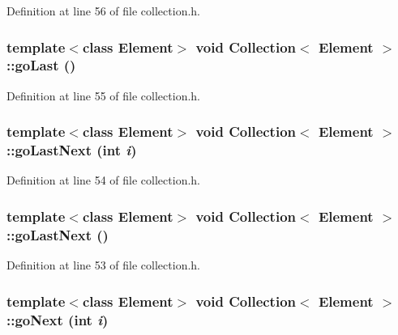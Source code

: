 Definition at line 56 of file collection.h.\hypertarget{classCollection_24f595ff9a3daddd71e9625e12086b8d}{
\subsubsection[{goLast}]{\setlength{\rightskip}{0pt plus 5cm}template$<$class Element$>$ void {\bf Collection}$<$ Element $>$::goLast ()}}
\label{classCollection_24f595ff9a3daddd71e9625e12086b8d}




Definition at line 55 of file collection.h.\hypertarget{classCollection_c8d2b742e6ccaf94d0e2511840a1783c}{
\subsubsection[{goLastNext}]{\setlength{\rightskip}{0pt plus 5cm}template$<$class Element$>$ void {\bf Collection}$<$ Element $>$::goLastNext (int {\em i})}}
\label{classCollection_c8d2b742e6ccaf94d0e2511840a1783c}




Definition at line 54 of file collection.h.\hypertarget{classCollection_ae18eb14625c9f4742d0c90e437f6035}{
\subsubsection[{goLastNext}]{\setlength{\rightskip}{0pt plus 5cm}template$<$class Element$>$ void {\bf Collection}$<$ Element $>$::goLastNext ()}}
\label{classCollection_ae18eb14625c9f4742d0c90e437f6035}




Definition at line 53 of file collection.h.\hypertarget{classCollection_8fe6a6dbc35949197de73013bb67fa07}{
\subsubsection[{goNext}]{\setlength{\rightskip}{0pt plus 5cm}template$<$class Element$>$ void {\bf Collection}$<$ Element $>$::goNext (int {\em i})}}
\label{classCollection_8fe6a6dbc35949197de73013bb67fa07}




